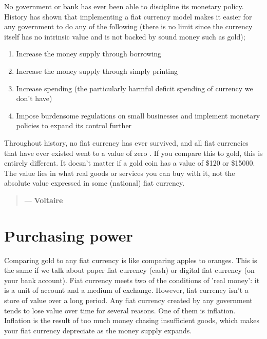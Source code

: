No government or bank has ever been able to discipline its monetary policy. History has shown that implementing a fiat currency model makes it easier for any government to do any of the following (there is no limit since the currency itself has no intrinsic value and is not backed by sound money such as gold);

\begin{enumerate}[label=(\alph*)]
    \setlength\itemsep{0em}
    \item Increase the money supply through borrowing
    \item Increase the money supply through simply printing
    \item Increase spending (the particularly harmful deficit spending of currency we don't have)
    \item Impose burdensome regulations on small businesses and implement monetary policies to expand its control further
\end{enumerate}

\noindent Throughout history, no fiat currency has ever survived, and all fiat currencies that have ever existed went to a value of zero \parencite{thebigreset}. If you compare this to gold, this is entirely different. It doesn't matter if a gold coin has a value of \$120 or \$15000. The value lies in what real goods or services you can buy with it, not the absolute value expressed in some (national) fiat currency.

\begin{quotation}

      \textit{}
      \begin{flushright}
        \small{--- \textbf{Voltaire}}
      \end{flushright}
    
\end{quotation}

\section*{Purchasing power}
Comparing gold to any fiat currency is like comparing apples to oranges. This is the same if we talk about paper fiat currency (cash) or digital fiat currency (on your bank account).  Fiat currency meets two of the conditions of 'real money': it is a unit of account and a medium of exchange. However, fiat currency isn't a store of value over a long period.  Any fiat currency created by any government tends to lose value over time for several reasons. One of them is inflation. Inflation is the result of too much money chasing insufficient goods, which makes your fiat currency depreciate as the money supply expands. 

